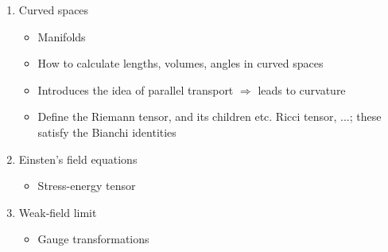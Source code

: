 \documentclass[a4paper]{article} %
\begin{document}
\begin{enumerate}
\begin{itemize}
\end{itemize}
\item Curved spaces
\begin{itemize}
\item Manifolds 
\item How to calculate lengths, volumes, angles in curved spaces
\item Introduces the idea of parallel transport $\Rightarrow$ leads to curvature
\item Define the Riemann tensor, and its children etc. Ricci tensor, ...; these satisfy the Bianchi identities
\end{itemize}
\item Einsten's field equations
\begin{itemize}
\item Stress-energy tensor
\end{itemize}
\item Weak-field limit
\begin{itemize}
\item Gauge transformations
\end{itemize}

\end{enumerate}
\end{document}
